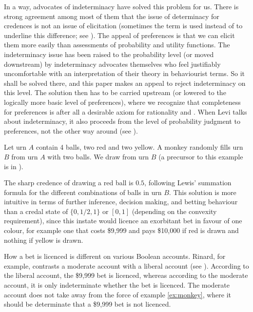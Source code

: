 \documentclass[11pt]{article}
\begin{document}
In a way, advocates of indeterminacy have solved this problem for us.
There is strong agreement among most of them that the issue of
determinacy for credences is not an issue of elicitation (sometimes
the term  is used instead of 
to underline this difference; see ). The appeal
of preferences is that we can elicit them more easily than assessments
of probability and utility functions. The indeterminacy issue has been
raised to the probability level (or moved downstream) by indeterminacy
advocates themselves who feel justifiably uncomfortable with an
interpretation of their theory in behaviourist terms. So it shall be
solved there, and this paper makes an appeal to reject indeterminacy
on this level. The solution then has to be carried upstream (or
lowered to the logically more basic level of preferences), where we
recognize that completeness for preferences is after all a desirable
axiom for rationality and  . When Levi talks
about indeterminacy, it also proceeds from the level of probability
judgment to preferences, not the other way around (see
).

\begin{quotex}
  \label{ex:monkey} Let urn $A$ contain 4
  balls, two red and two yellow. A monkey randomly fills urn $B$ from
  urn $A$ with two balls. We draw from urn $B$ (a precursor to this
  example is in ).
\end{quotex}

The sharp credence of drawing a red ball is $0.5$, following Lewis'
summation formula for the different combinations of balls in urn $B$.
This solution is more intuitive in terms of further inference,
decision making, and betting behaviour than a credal state of
$\{0,1/2,1\}$ or $[0,1]$ (depending on the convexity requirement),
since this instate would licence an exorbitant bet in favour of one
colour, for example one that costs \$9,999 and pays \$10,000 if red is
drawn and nothing if yellow is drawn. 

How a bet is licenced is different on various Boolean accounts.
Rinard, for example, contrasts a moderate account with a liberal
account (see ). According to the liberal
account, the \$9,999 bet is licenced, whereas according to the
moderate account, it is only indeterminate whether the bet is
licenced. The moderate account does not take away from the force of
example \ref{ex:monkey}, where it should be determinate that a \$9,999
bet is not licenced.
\end{document}
